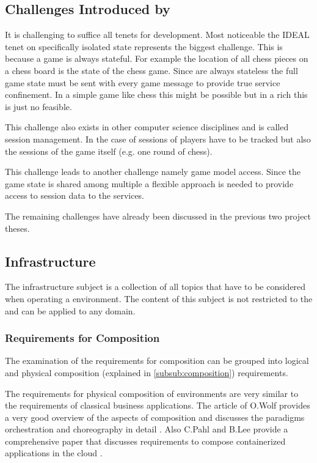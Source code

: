 \subsection{Challenges Introduced by \mss{}}

It is challenging to suffice all \ms{} tenets for \og{} development. Most
noticeable the IDEAL tenet on specifically isolated state represents the biggest
challenge. This is because a game is always stateful. For example the location
of all chess pieces on a chess board is the state of the chess game. Since
\mss{} are always stateless the full game state must be sent with every game
message to provide true service confinement. In a simple game like chess this
might be possible but in a rich \og{} this is just no feasible. 

This challenge also exists in other computer science disciplines and is called
session management. In the case of \ogs{} sessions of players have to be
tracked but also the sessions of the game itself (e.g. one round of chess).

This challenge leads to another challenge namely game model access. Since the
game state is shared among multiple \mss{} a flexible approach is needed to
provide access to session data to the services.

The remaining challenges have already been discussed in the previous two project
theses.

\subsection{\ms{} Infrastructure}

The \ms{} infrastructure subject is a collection of all topics that have to be
considered when operating a \ms{} environment. The content of this subject is
not restricted to the \ogs{} and can be applied to any domain.

\subsubsection{Requirements for \ms{} Composition}

The examination of the requirements for \ms{} composition can be grouped into
logical and physical composition (explained in \autoref{subsub:composition})
requirements.

The requirements for physical composition of \ms{} \og{} environments are very
similar to the requirements of classical business applications. The article of
O.Wolf provides a very good overview of the aspects of \ms{} composition and
discusses the paradigms orchestration and choreography in detail \cite{wolf_ms}.
Also C.Pahl and B.Lee provide a comprehensive paper that discusses requirements
to compose containerized applications in the cloud \cite{pahl2015containers}.

